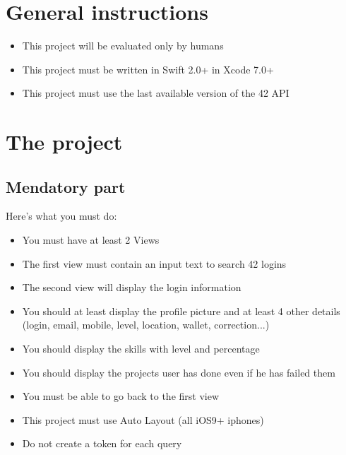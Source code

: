 \documentclass{42}
\begin{document}
\chapter{General instructions}

    \begin{itemize}\itemsep6pt
        \item This project will be evaluated only by humans
        \item This project must be written in Swift 2.0+ in Xcode 7.0+
        \item This project must use the last available version of the 42 API
    \end{itemize}



\newpage
    \chapter{The project}
        \section{Mendatory part}
    
	    Here's what you must do:\\
	    \vspace{5mm}
	    \begin{itemize}\itemsep6pt
	        \item You must have at least 2 Views
	        \item The first view must contain an input text to search 42 logins
	        \item The second view will display the login information
	        \item You should at least display the profile picture and at least 4 other details (login, email, mobile, level, location, wallet, correction...)
	        \item You should display the skills with level and percentage
	        \item You should display the projects user has done even if he has failed them
	        \item You must be able to go back to the first view
	        \item This project must use Auto Layout (all iOS9+ iphones)
	        \item Do not create a token for each query
	    \end{itemize}
\end{document}
